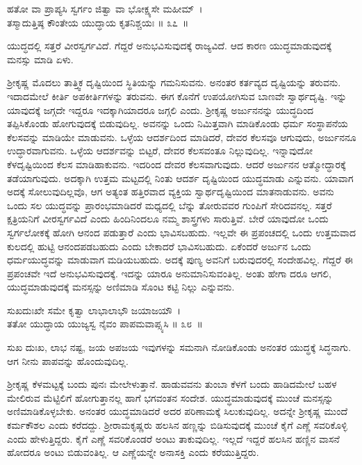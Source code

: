 \begin{shloka}
ಹತೋ ವಾ ಪ್ರಾಪ್ಯಸಿ ಸ್ವರ್ಗಂ ಜಿತ್ವಾ ವಾ ಭೋಕ್ಷ್ಯಸೇ ಮಹೀಮ್~।\\ತಸ್ಮಾದುತ್ತಿಷ್ಠ ಕೌಂತೇಯ ಯುದ್ಧಾಯ ಕೃತನಿಶ್ಚಯಃ \hfill॥ ೩೭~॥
\end{shloka}

\begin{artha}
ಯುದ್ಧದಲ್ಲಿ ಸತ್ತರೆ ವೀರಸ್ವರ್ಗವಿದೆ. ಗೆದ್ದರೆ ಅನುಭವಿಸುವುದಕ್ಕೆ ರಾಜ್ಯವಿದೆ. ಆದ ಕಾರಣ ಯುದ್ಧಮಾಡುವುದಕ್ಕೆ ಮನಸ್ಸು ಮಾಡಿ ಏಳು.
\end{artha}

ಶ‍್ರೀಕೃಷ್ಣ ಮೊದಲು ತಾತ್ತ್ವಿಕ ದೃಷ್ಟಿಯಿಂದ ಸ್ಥಿತಿಯನ್ನು ಗಮನಿಸುವನು. ಅನಂತರ ಕರ್ತವ್ಯದ ದೃಷ್ಟಿಯನ್ನು ತರುವನು. ಇದಾದಮೇಲೆ ಕೀರ್ತಿ ಅಪಕೀರ್ತಿಗಳನ್ನು ತರುವನು. ಈಗ ಕೊನೆಗೆ ಉಪಯೋಗಿಸುವ ಬಾಣವೇ ಸ್ವಾರ್ಥದೃಷ್ಟಿ. ಇನ್ನು ಯಾವುದಕ್ಕೆ ಜಗ್ಗದೇ ಇದ್ದರೂ ಇದಕ್ಕಾಗಿಯಾದರೂ ಜಗ್ಗಲಿ ಎಂದು. ಶ‍್ರೀಕೃಷ್ಣ ಅರ್ಜುನನನ್ನು ಯುದ್ಧದಿಂದ ತಪ್ಪಿಸಿಕೊಂಡು ಹೋಗುವುದಕ್ಕೆ ಬಿಡುವುದಿಲ್ಲ. ಅವನನ್ನು ಒಂದು ನಿಮಿತ್ತವಾಗಿ ಮಾಡಿಕೊಂಡು ಧರ್ಮ ಸಂಸ್ಥಾಪನೆಯ ಕೆಲಸವನ್ನು ಮಾಡಿಯೇ ಮಾಡುವನು. ಒಳ್ಳೆಯ ಆದರ್ಶದಿಂದ ಮಾಡಿದರೆ, ದೇವರ ಕೆಲಸವೂ ಆಗುವುದು, ಅರ್ಜುನನೂ ಉದ್ಧಾರವಾಗುವನು. ಒಳ್ಳೆಯ ಆದರ್ಶವನ್ನು ಬಿಟ್ಟರೆ, ದೇವರ ಕೆಲಸವಂತೂ ನಿಲ್ಲುವುದಿಲ್ಲ. ಇನ್ನಾವುದೋ ಕೆಳದೃಷ್ಟಿಯಿಂದ ಕೆಲಸ ಮಾಡಿಹಾಕುವನು. ಇದರಿಂದ ದೇವರ ಕೆಲಸವಾಗುವುದು. ಆದರೆ ಅರ್ಜುನನ ಆತ್ಮೋದ್ಧಾರಕ್ಕೆ ತಡೆಯಾಗುವುದು. ಅದಕ್ಕಾಗಿ ಉತ್ತಮ ಮಟ್ಟದಲ್ಲಿ ನಿಂತು ಆದರ್ಶ ದೃಷ್ಟಿಯಿಂದ ಯುದ್ಧಮಾಡು ಎನ್ನುವನು. ಯಾವಾಗ ಅದಕ್ಕೆ ಸೋಲುವುದಿಲ್ಲವೊ, ಆಗ ಅತ್ಯಂತ ಹತ್ತಿರವಾದ ವ್ಯಕ್ತಿಯ ಸ್ವಾರ್ಥದೃಷ್ಟಿಯಿಂದ ಮಾತನಾಡುವನು. ಅವನು ಒಂದು ಸಲ ಯುದ್ಧವನ್ನು ಪ್ರಾರಂಭಮಾಡಿದರೆ ಮಧ್ಯದಲ್ಲಿ ಬೆನ್ನು ತೋರುವವರ ಗುಂಪಿಗೆ ಸೇರಿದವನಲ್ಲ. ಸತ್ತರೆ ಕ್ಷತ್ರಿಯನಿಗೆ ವೀರಸ್ವರ್ಗವಿದೆ ಎಂದು ಹಿಂದಿನಿಂದಲೂ ನಮ್ಮ ಶಾಸ್ತ್ರಗಳು ಸಾರುತ್ತಿವೆ. ಬೇರೆ ಯಾವುದೋ ಒಂದು ಸ್ವರ್ಗಲೋಕಕ್ಕೆ ಹೋಗಿ ಆನಂದ ಪಡುತ್ತಾರೆ ಎಂದು ಭಾವಿಸಬಹುದು. ಇಲ್ಲವೇ ಈ ಪ್ರಪಂಚದಲ್ಲಿ ಒಂದು ಉತ್ತಮವಾದ ಕುಲದಲ್ಲಿ ಹುಟ್ಟಿ ಆನಂದಪಡಬಹುದು ಎಂದು ಬೇಕಾದರೆ ಭಾವಿಸಬಹುದು. ಏಕೆಂದರೆ ಅರ್ಜುನ ಒಂದು ಧರ್ಮಯುದ್ಧವನ್ನು ಮಾಡುವಾಗ ಮಡಿಯಬಹುದು. ಅದಕ್ಕೆ ಪುಣ್ಯ ಅವನಿಗೆ ಬರುವುದರಲ್ಲಿ ಸಂದೇಹವಿಲ್ಲ. ಗೆದ್ದರೆ ಈ ಪ್ರಪಂಚವೇ ಇದೆ ಅನುಭವಿಸುವುದಕ್ಕೆ. ಇದನ್ನು ಯಾರೂ ಅನುಮಾನಿಸುವಂತಿಲ್ಲ. ಅಂತು ಹೇಗಾ ದರೂ ಆಗಲಿ, ಯುದ್ಧಮಾಡುವುದಕ್ಕೆ ಮನಸ್ಸನ್ನು ಅಣಿಮಾಡಿ ಸೊಂಟ ಕಟ್ಟಿ ನಿಲ್ಲು ಎನ್ನುವನು.

\begin{shloka}
ಸುಖದುಃಖೇ ಸಮೇ ಕೃತ್ವಾ ಲಾಭಾಲಾಭೌ ಜಯಾಜಯೌ~।\\ತತೋ ಯುದ್ಧಾಯ ಯುಜ್ಯಸ್ವ ನೈವಂ ಪಾಪಮವಾಪ್ಸ್ಯಸಿ \hfill॥ ೩೮~॥
\end{shloka}

\begin{artha}
ಸುಖ ದುಃಖ, ಲಾಭ ನಷ್ಟ, ಜಯ ಅಪಜಯ ಇವುಗಳನ್ನು ಸಮನಾಗಿ ನೋಡಿಕೊಂಡು ಅನಂತರ ಯುದ್ಧಕ್ಕೆ ಸಿದ್ಧನಾಗು. ಆಗ ನೀನು ಪಾಪವನ್ನು ಹೊಂದುವುದಿಲ್ಲ.
\end{artha}

ಶ‍್ರೀಕೃಷ್ಣ ಕೆಳಮಟ್ಟಕ್ಕೆ ಬಂದು ಪುನಃ ಮೇಲೇಳುತ್ತಾನೆ. ಹಾಡುವವನು ತುಂಬಾ ಕೆಳಗೆ ಬಂದು ಹಾಡಿದಮೇಲೆ ಬಹಳ ಮೇಲಿರುವ ಮೆಟ್ಟಿಲಿಗೆ ಹೋಗುತ್ತಾನಲ್ಲ ಹಾಗೆ ಭಗವಂತನ ಸಂದೇಶ. ಯುದ್ಧಮಾಡುವುದಕ್ಕೆ ಮುಂಚೆ ಮನಸ್ಸನ್ನು ಅಣಿಮಾಡಿಕೊಳ್ಳಬೇಕು. ಅನಂತರ ಯುದ್ಧಮಾಡಿದರೆ ಅದರ ಪರಿಣಾಮಕ್ಕೆ ಸಿಲುಕುವುದಿಲ್ಲ. ಅದನ್ನೇ ಶ‍್ರೀಕೃಷ್ಣ ಮುಂದೆ ಕರ್ಮಕೌಶಲ ಎಂದು ಕರೆದದ್ದು. ಶ‍್ರೀರಾಮಕೃಷ್ಣರು ಹಲಸಿನ ಹಣ್ಣನ್ನು ಬಿಡಿಸುವುದಕ್ಕೆ ಮುಂಚೆ ಕೈಗೆ ಎಣ್ಣೆ ಸವರಿಕೊಳ್ಳಿ ಎಂದು ಹೇಳುತ್ತಿದ್ದರು. ಕೈಗೆ ಎಣ್ಣೆ ಸವರಿಕೊಂಡರೆ ಅಂಟು ತಾಕುವುದಿಲ್ಲ. ಇಲ್ಲದೆ ಇದ್ದರೆ ಹಲಸಿನ ಹಣ್ಣಿನ ವಾಸನೆ ಹೋದರೂ ಅಂಟು ಬಿಡುವಂತಿಲ್ಲ. ಆ ಎಣ್ಣೆಯನ್ನೇ ಅನಾಸಕ್ತಿ ಎಂದು ಕರೆಯುತ್ತಿದ್ದರು.

